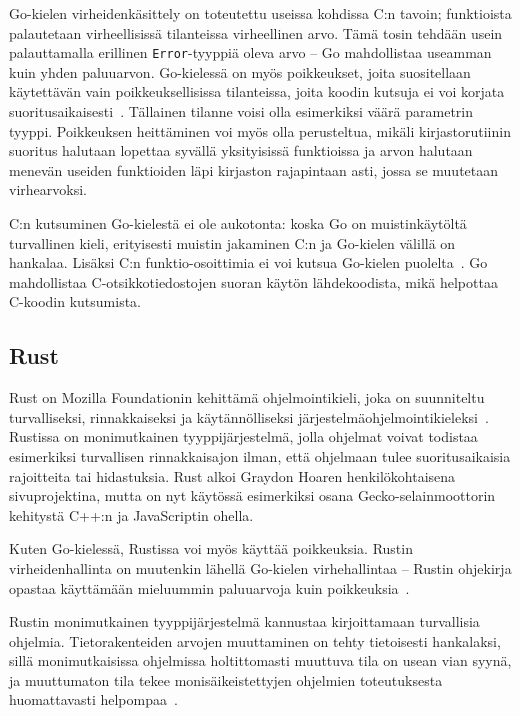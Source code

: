 Go-kielen virheidenkäsittely on toteutettu useissa kohdissa C:n tavoin;
funktioista palautetaan virheellisissä tilanteissa virheellinen arvo. Tämä
tosin tehdään usein palauttamalla erillinen \texttt{Error}-tyyppiä oleva arvo
-- Go mahdollistaa useamman kuin yhden paluuarvon. Go-kielessä on myös
poikkeukset, joita suositellaan käytettävän vain poikkeuksellisissa
tilanteissa, joita koodin kutsuja ei voi korjata
suoritusaikaisesti~\citep{effectivego}. Tällainen tilanne voisi olla esimerkiksi
väärä parametrin tyyppi. Poikkeuksen heittäminen voi myös olla perusteltua,
mikäli kirjastorutiinin suoritus halutaan lopettaa syvällä yksityisissä
funktioissa ja arvon halutaan menevän useiden funktioiden läpi kirjaston
rajapintaan asti, jossa se muutetaan virhearvoksi.

C:n kutsuminen Go-kielestä ei ole aukotonta: koska Go on muistinkäytöltä
turvallinen kieli, erityisesti muistin jakaminen C:n ja Go-kielen välillä on
hankalaa. Lisäksi C:n funktio-osoittimia ei voi kutsua Go-kielen
puolelta~\citep{cgo}. Go mahdollistaa C-otsikkotiedostojen suoran käytön
lähdekoodista, mikä helpottaa C-koodin kutsumista.

\subsection{Rust}
\label{sec:rust}

Rust on Mozilla Foundationin kehittämä ohjelmointikieli, joka on suunniteltu
turvalliseksi, rinnakkaiseksi ja käytännölliseksi
järjestelmäohjelmointikieleksi~\citep{rustfaq}. Rustissa on monimutkainen
tyyppijärjestelmä, jolla ohjelmat voivat todistaa esimerkiksi turvallisen
rinnakkaisajon ilman, että ohjelmaan tulee suoritusaikaisia rajoitteita tai
hidastuksia. Rust alkoi Graydon Hoaren henkilökohtaisena sivuprojektina, mutta
on nyt käytössä esimerkiksi osana Gecko-se\-lain\-moot\-to\-rin kehitystä C++:n ja
JavaScriptin ohella.

Kuten Go-kielessä, Rustissa voi myös käyttää poikkeuksia. Rustin
virheidenhallinta on muutenkin lähellä Go-kielen virhehallintaa -- Rustin
ohjekirja opastaa käyttämään mieluummin paluuarvoja kuin
poikkeuksia~\citep{rusterrorhandling}.

Rustin monimutkainen tyyppijärjestelmä kannustaa kirjoittamaan turvallisia
ohjelmia. Tietorakenteiden arvojen muuttaminen on tehty tietoisesti hankalaksi,
sillä monimutkaisissa ohjelmissa holtittomasti muuttuva tila on usean vian
syynä, ja muuttumaton tila tekee monisäikeistettyjen
ohjelmien toteutuksesta huomattavasti helpompaa~\citep[luku 4, kohta
17]{effectivejava}.

